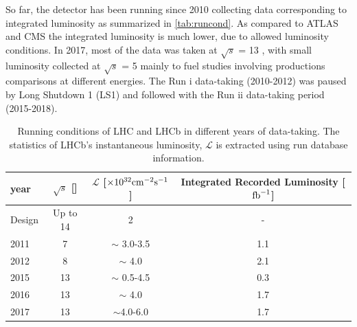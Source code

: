 So far, the detector has been running since 2010 collecting data corresponding to integrated luminosity as summarized in \autoref{tab:runcond}. As compared to \Gls{ATLAS} and \Gls{CMS} the integrated luminosity is much lower, due to allowed luminosity conditions. In 2017, most of the data was taken at $\sqrt{s}$ = 13 \tev, with small luminosity collected at $\sqrt{s}$ = 5 \tev mainly to fuel studies involving productions comparisons at different energies. The Run \Rn{1} data-taking (2010-2012) was paused by Long Shutdown 1 (\Gls{LS1}) and followed with the Run \Rn{2} data-taking period (2015-2018). 




\begin{table}[!h]
	\centering
	\hspace*{-0.8cm}
	\begin{tabular}{l c c c }
		\hline
		year & $\sqrt{s}$ [\tev] & $\mathcal{L}$ [$\times10^{32} \rm{cm^{-2}s^{-1}}$] & Integrated Recorded Luminosity [$\rm{fb}^{-1}$] \\ \hline
		Design & Up to 14 & 2 & - \\
		2011 & 7 & $\sim$ 3.0-3.5 & 1.1 \\
		2012 & 8 & $\sim$ 4.0 & 2.1 \\
		2015 & 13 & $\sim$ 0.5-4.5 & 0.3 \\      
		2016 & 13 & $\sim$ 4.0 & 1.7  \\      
		2017 & 13 & $\sim$4.0-6.0 & 1.7 \\\hline      
	\end{tabular}
	\caption{Running conditions of \gls{LHC} and \Gls{LHCb} in different years of data-taking. The statistics of \gls{LHCb}'s instantaneous luminosity, $\mathcal{L}$ is extracted using run database information.}
	\label{tab:runcond}
\end{table}   

